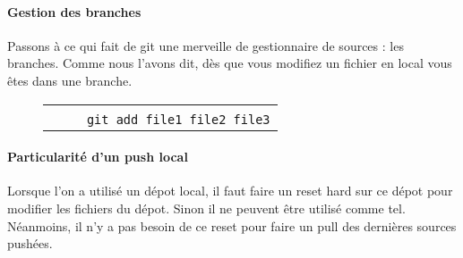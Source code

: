 \paragraph{Gestion des branches} Passons à ce qui fait de git une merveille de gestionnaire de sources : les branches. Comme nous l'avons dit, dès que vous modifiez un fichier en local vous êtes dans une branche.

\begin{figure}[H]
      \begin{tabular}{l}
	\textit{}\\
	\verb|     git add file1 file2 file3|\\
     \end{tabular}
\end{figure}

\paragraph{Particularité d'un push local}
Lorsque l'on a utilisé un dépot local, il faut faire un reset hard sur ce dépot pour modifier les fichiers du dépot. Sinon il ne peuvent être utilisé comme tel. Néanmoins, il n'y a pas besoin de ce reset pour faire un pull des dernières sources pushées.

